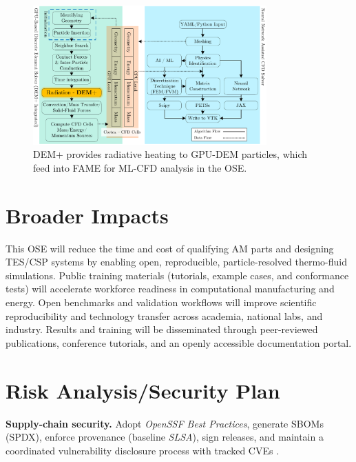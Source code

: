 \documentclass[11pt]{article}
\begin{document}
\begin{figure}[h]
\centering
\includegraphics[width=0.8\textwidth]{figures/Flowchart.pdf}
\caption{DEM+ provides radiative heating to GPU-DEM particles, which feed into FAME for ML-CFD analysis in the OSE.}
\label{fig:integration}
\end{figure}

\section*{Broader Impacts}
\vspace{-3pt}
\noindent
This OSE will reduce the time and cost of qualifying AM parts and designing TES/CSP systems by enabling open, reproducible, particle-resolved thermo-fluid simulations. Public training materials (tutorials, example cases, and conformance tests) will accelerate workforce readiness in computational manufacturing and energy. Open benchmarks and validation workflows will improve scientific reproducibility and technology transfer across academia, national labs, and industry. Results and training will be disseminated through peer-reviewed publications, conference tutorials, and an openly accessible documentation portal.
\section*{Risk Analysis/Security Plan}
\vspace{4pt}
\noindent\textbf{Supply-chain security.} Adopt \textit{OpenSSF Best Practices}, generate SBOMs (SPDX), enforce provenance (baseline \textit{SLSA}), sign releases, and maintain a coordinated vulnerability disclosure process with tracked CVEs \cite{foundationopenssfConciseGuideDeveloping, foundationopenssfSourceCodeManagement,SecuringSoftwareSupply2025}. %
\end{document}
